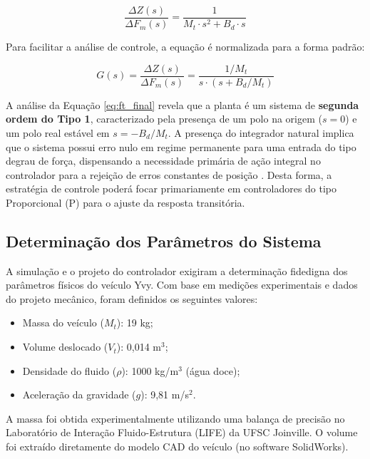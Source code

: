\documentclass[12pt, a4paper]{article}
\newcommand{\vehicleMass}{M_t}
\newcommand{\vehicleVolume}{V_t}
\begin{document}
			\begin{equation}
				\frac{\Delta Z(s)}{\Delta F_{m}(s)} = \frac{1}{M_t \cdot s^2 + B_d \cdot s}
			\end{equation}

			Para facilitar a análise de controle, a equação é normalizada para a forma padrão:

			\begin{equation}
				G(s) = \frac{\Delta Z(s)}{\Delta F_{m}(s)} = \frac{1/M_t}{s \cdot (s + B_d/M_t)}
				\label{eq:ft_final}
			\end{equation}

			A análise da Equação \ref{eq:ft_final} revela que a planta é um sistema de {\bfseries segunda ordem do Tipo 1}, caracterizado pela presença de um polo na origem ($s=0$) e um polo real estável em $s = -B_d/M_t$. A presença do integrador natural implica que o sistema possui erro nulo em regime permanente para uma entrada do tipo degrau de força, dispensando a necessidade primária de ação integral no controlador para a rejeição de erros constantes de posição \cite{ogata}. Desta forma, a estratégia de controle poderá focar primariamente em controladores do tipo Proporcional (P) para o ajuste da resposta transitória.

		\subsection{Determinação dos Parâmetros do Sistema}

			A simulação e o projeto do controlador exigiram a determinação fidedigna dos parâmetros físicos do veículo Yvy. Com base em medições experimentais e dados do projeto mecânico, foram definidos os seguintes valores:

			\begin{itemize}
				\item Massa do veículo ($\vehicleMass$): 19 kg;
				\item Volume deslocado ($\vehicleVolume$): 0,014 m$^3$;
				\item Densidade do fluido ($\rho$): 1000 kg/m$^3$ (água doce);
				\item Aceleração da gravidade ($g$): 9,81 m/s$^2$.
			\end{itemize}

			A massa foi obtida experimentalmente utilizando uma balança de precisão no Laboratório de Interação Fluido-Estrutura (LIFE) da UFSC Joinville. O volume foi extraído diretamente do modelo CAD do veículo (no software SolidWorks).
\end{document}
